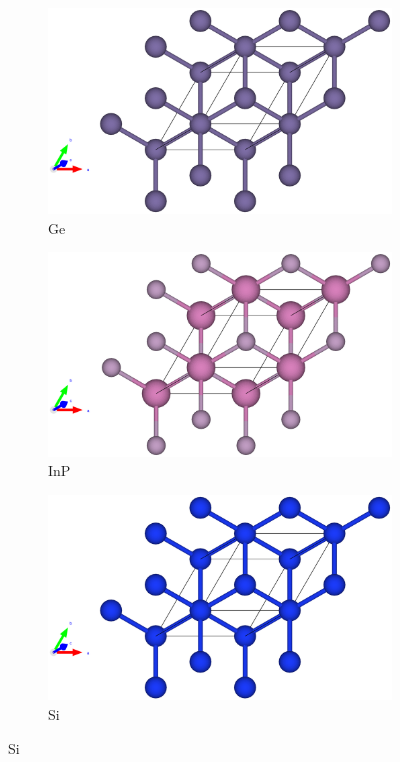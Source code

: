 \begin{figure}[htb]
    \centering %
\begin{subfigure}{0.3\textwidth}
  \includegraphics[width=\linewidth]{images/ge_st_3d.eps}
  \caption{Ge}
\end{subfigure}\hfil %
\begin{subfigure}{0.3\textwidth}
  \includegraphics[width=\linewidth]{images/inp_st_3d.eps}
  \caption{InP}
\end{subfigure}
\begin{subfigure}{0.3\textwidth}
  \includegraphics[width=\linewidth]{images/si_st_3d.eps}
  \caption{Si}
\end{subfigure}\hfil %


\end{figure}
